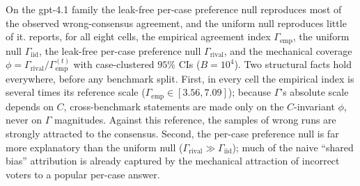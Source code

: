 \documentclass[a4paper,fleqn]{cas-sc}
\newcommand{\agreementIndex}{\Gamma}
\begin{document}
On the gpt-4.1 family the leak-free per-case preference null
reproduces most of the observed wrong-consensus agreement, and the
uniform null reproduces little of it.  reports, for all
eight cells, the empirical agreement
index $\agreementIndex_{\mathrm{emp}}$, the uniform null $\agreementIndex_{\mathrm{iid}}$,
the leak-free per-case preference null $\agreementIndex_{\mathrm{rival}}$, and the
mechanical coverage $\phi=\agreementIndex_{\mathrm{rival}}/\agreementIndex_{\mathrm{emp}}^{(t)}$ with case-clustered $95\%$ CIs ($B=10^4$). Two structural facts
hold everywhere, before any benchmark split. First, in every cell the
empirical index is several times its reference scale
($\agreementIndex_{\mathrm{emp}}\in[3.56,7.09]$); because $\agreementIndex$'s absolute scale
depends on $C$, cross-benchmark statements are made only on the
$C$-invariant $\phi$, never on $\agreementIndex$ magnitudes. Against this reference,
the samples of wrong runs are strongly attracted
to the consensus. Second, the per-case preference null is far more
explanatory than the uniform null ($\agreementIndex_{\mathrm{rival}}\gg
\agreementIndex_{\mathrm{iid}}$); much of the naive ``shared
bias'' attribution is already captured by the mechanical attraction of
incorrect voters to a popular per-case answer.
\end{document}
